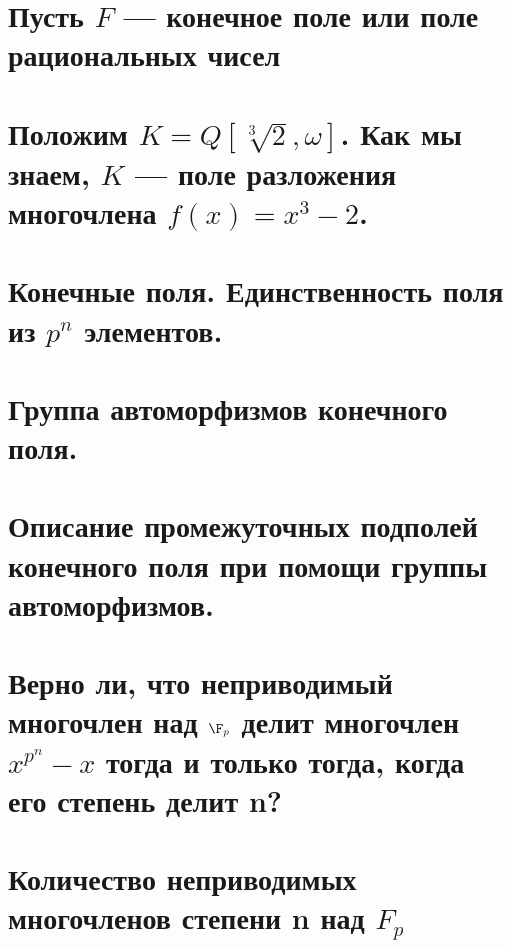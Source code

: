\section{Пусть $F$ — конечное поле или поле рациональных чисел}

\newpage{}

\section{Положим $K = Q[\sqrt[3]{2}, \omega]$. Как мы знаем, $K$ — поле разложения многочлена $f(x) = x^3 − 2$.}

\newpage{}

\section{Конечные поля. Единственность поля из $p^n$ элементов.}


\section{Группа автоморфизмов конечного поля.}


\section{Описание промежуточных подполей конечного поля при помощи группы автоморфизмов.}

\newpage{}

\section{Верно ли, что неприводимый многочлен над $\F_p$ делит многочлен $x^{p^n} - x$ тогда и только тогда, когда его степень делит n?}


\section{Количество неприводимых многочленов степени n над $F_p$}

\newpage{}